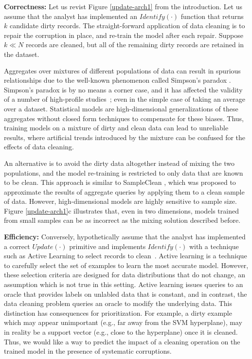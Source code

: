 \vspace{0.5em}
\textbf{Correctness: } Let us revist Figure \ref{update-arch1} from the introduction. Let us assume that the analyst has implemented an $Identify(\cdot)$ function that returns $k$ candidate dirty records.
The straight-forward application of data cleaning is to repair the corruption in place, and re-train the model after each repair.
Suppose $k \ll N$ records are cleaned, but all of the remaining dirty records are retained in the dataset.

Aggregates over mixtures of different populations of data can result in spurious relationships due to the well-known phenomenon called Simpson's paradox \cite{simpson1951interpretation}.
Simpson's paradox is by no means a corner case, and it has affected the validity of a number of high-profile studies~\cite{simpsonsparadox}; even in the simple case of taking an average over a dataset.
Statistical models are high-dimensional generalizations of these aggregates without closed form techniques to compensate for these biases.
Thus, training models on a mixture of dirty and clean data can lead to unreliable results, where artificial trends introduced by the mixture can be confused for the effects of data cleaning.

An alternative is to avoid the dirty data altogether instead of mixing the two populations, and the model re-training is restricted to only data that are known to be clean.
This approach is similar to SampleClean \cite{wang1999sample}, which was proposed to approximate the results of aggregate queries by applying them to a clean sample of data.
However, high-dimensional models are highly sensitive to sample size.
Figure \ref{update-arch1}c illustrates that, even in two dimensions, models trained from small samples can be as incorrect as the mixing solution described before.

\vspace{0.5em} 

\textbf{Efficiency: } Conversely, hypothetically assume that the analyst has implemented a correct $Update(\cdot)$ primitive and implements $Identify(\cdot)$ with a technique such as Active Learning to select records to clean~\cite{yakout2013don,DBLP:journals/pvldb/YakoutENOI11,gokhale2014corleone}.
Active learning is a technique to carefully select the set of examples to learn the most accurate model.
However, these selection criteria are designed for data distributions that do not change, an assumption which is not true in this setting.
Active learning issues queries to an oracle that provides labels on unlabled data that is constant, and in contrast, the data cleaning problem queries an oracle to modify the underlying data.
This distinction has consequences for prioritization.
For example, a dirty example which may appear unimportant (e.g., far away from the SVM hyperplane), may in reality be a support vector (e.g., close to the hyperplane) once it is cleaned.  
Thus, we would like a way to predict the impact of a cleaning operation on the trained model in the presence of systematic corruptions.




